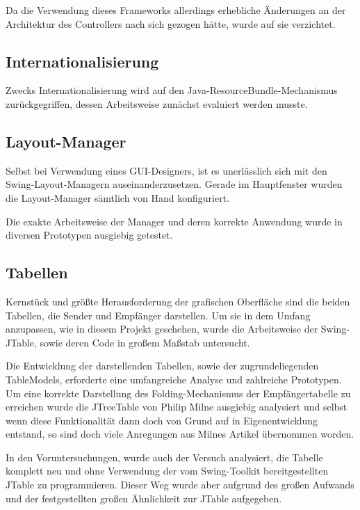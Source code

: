         Da die Verwendung dieses Frameworks allerdings erhebliche Änderungen an
        der Architektur des Controllers nach sich gezogen hätte, wurde auf sie
        verzichtet.
        
    \subsection{Internationalisierung}
    
        Zwecks Internationalisierung wird auf den
        Java-ResourceBundle-Mechanismus zurückgegriffen, dessen Arbeitsweise
        zunächst evaluiert werden musste.
        
    \subsection{Layout-Manager}
    
        Selbst bei Verwendung eines GUI-Designers, ist es unerlässlich sich mit
        den Swing-Layout-Managern auseinanderzusetzen. Gerade im Hauptfenster
        wurden die Layout-Manager sämtlich von Hand konfiguriert.
        
        Die exakte Arbeitsweise der Manager und deren korrekte Anwendung wurde
        in diversen Prototypen ausgiebig getestet.
        
     \subsection{Tabellen}
     
        Kernstück und größte Herausforderung der grafischen Oberfläche sind die
        beiden Tabellen, die Sender und Empfänger darstellen. Um sie in dem
        Umfang anzupassen, wie in diesem Projekt geschehen, wurde die
        Arbeitsweise der Swing-JTable, sowie deren Code in großem Maßstab
        untersucht.
        
        Die Entwicklung der darstellenden Tabellen, sowie der zugrundeliegenden
        TableModels, erforderte eine umfangreiche Analyse und zahlreiche
        Prototypen. Um eine korrekte Darstellung des Folding-Mechanismus der
        Empfängertabelle zu erreichen wurde die JTreeTable von Philip Milne
        ausgiebig analysiert und selbst wenn diese Funktionalität dann doch von
        Grund auf in Eigenentwicklung entstand, so sind doch viele Anregungen
        aus Milnes Artikel übernommen worden.
        
        In den Voruntersuchungen, wurde auch der Versuch analysiert, die
        Tabelle komplett neu und ohne Verwendung der vom Swing-Toolkit
        bereitgestellten JTable zu programmieren. Dieser Weg wurde aber aufgrund
        des großen Aufwands und der festgestellten großen Ähnlichkeit zur
        JTable aufgegeben.

